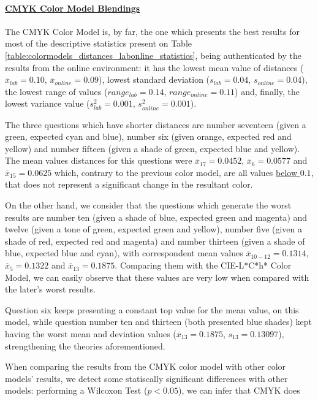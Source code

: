 \paragraph{\ul{CMYK Color Model Blendings}}
\label{par:cmykcolormodel}
%
The CMYK Color Model is, by far, the one which presents the best results for most of the descriptive statistics present on Table \ref{table:colormodels_distances_labonline_statistics}, being authenticated by the
results from the online environment: it has the lowest mean value of distances ($\overline{x}_{lab} = 0.10$, $\overline{x}_{online} = 0.09$), lowest standard deviation ($s_{lab} = 0.04$, $s_{online} = 0.04$),
the lowest range of values ($range_{lab} = 0.14$, $range_{online} = 0.11$) and, finally, the lowest variance value ($s^2_{lab} = 0.001$, $s^2_{online} = 0.001$). \par
%
The three questions which have shorter distances are number seventeen (given a green, expected cyan and blue), number six (given orange, expected red and yellow) and number fifteen (given a shade of green, expected blue
and yellow). The mean values distances for this questions were $\overline{x}_{17} = 0.0452$, $\overline{x}_{6} = 0.0577$ and $\overline{x}_{15} = 0.0625$ which, contrary to the previous color model, are all values \ul{below $0.1$},
that does not represent a significant change in the resultant color. \par
%
On the other hand, we consider that the questions which generate the worst results are number ten (given a shade of blue, expected green and magenta) and twelve (given a tone of green, expected green and yellow), number five
(given a shade of red, expected red and magenta) and number thirteen (given a shade of blue, expected blue and cyan), with correspondent mean values $\overline{x}_{10-12} = 0.1314$, $\overline{x}_{5} = 0.1322$ and
$\overline{x}_{13} = 0.1875$. Comparing them with the CIE-L*C*h* Color Model, we can easily observe that these values are very low when compared with the later's worst results. \par
%
Question six keeps presenting a constant top value for the mean value, on this model, while question number ten and thirteen (both presented blue shades) kept having the worst mean and deviation values ($\overline{x}_{13} = 0.1875$,
$s_{13} = 0.13097$), strengthening the theories aforementioned. \par
%
When comparing the results from the CMYK color model with other color models' results, we detect some statiscally significant differences with other models: performing a Wilcoxon Test ($p < 0.05$), we can infer that CMYK does
